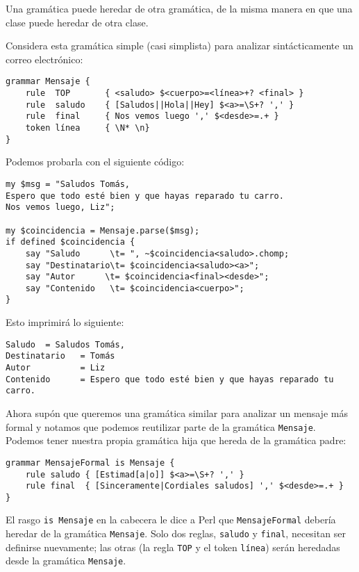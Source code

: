 Una gramática puede heredar de otra gramática, 
de la misma manera en que una clase puede 
heredar de otra clase.

Considera esta gramática simple (casi simplista) para 
analizar sintácticamente un correo electrónico:

\begin{lstlisting}
grammar Mensaje {
    rule  TOP       { <saludo> $<cuerpo>=<línea>+? <final> }
    rule  saludo    { [Saludos||Hola||Hey] $<a>=\S+? ',' }
    rule  final     { Nos vemos luego ',' $<desde>=.+ }
    token línea     { \N* \n}
}
\end{lstlisting}

Podemos probarla con el siguiente código:

\begin{lstlisting}
my $msg = "Saludos Tomás,
Espero que todo esté bien y que hayas reparado tu carro.
Nos vemos luego, Liz";

my $coincidencia = Mensaje.parse($msg);
if defined $coincidencia { 
    say "Saludo 	 \t= ", ~$coincidencia<saludo>.chomp;
    say "Destinatario\t= $coincidencia<saludo><a>";
    say "Autor   	\t= $coincidencia<final><desde>";
    say "Contenido   \t= $coincidencia<cuerpo>";
}
\end{lstlisting}

Esto imprimirá lo siguiente:

\begin{lstlisting}
Saludo 	= Saludos Tomás,
Destinatario   = Tomás
Autor          = Liz
Contenido      = Espero que todo esté bien y que hayas reparado tu carro.
\end{lstlisting}

Ahora supón que queremos una gramática similar para analizar
un mensaje más formal y notamos que podemos reutilizar parte
de la gramática {\tt Mensaje}. Podemos tener nuestra propia
gramática hija que hereda de la gramática padre:

\begin{lstlisting}
grammar MensajeFormal is Mensaje {
    rule saludo { [Estimad[a|o]] $<a>=\S+? ',' }
    rule final  { [Sinceramente|Cordiales saludos] ',' $<desde>=.+ }
}
\end{lstlisting}

El rasgo {\tt is Mensaje} en la cabecera le dice a Perl que 
{\tt MensajeFormal} debería heredar de la gramática {\tt Mensaje}.
Solo dos reglas, {\tt saludo} y {\tt final}, necesitan ser
definirse nuevamente; las otras (la regla {\tt TOP} y el token
{\tt línea}) serán heredadas desde la gramática {\tt Mensaje}.

